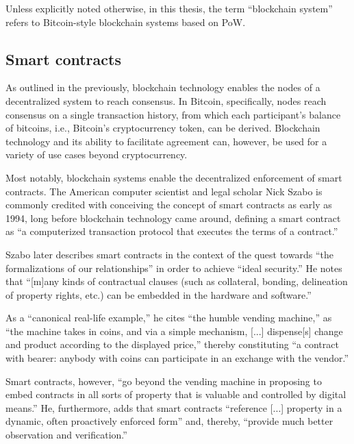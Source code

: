 Unless explicitly noted otherwise, in this thesis, the term ``blockchain system'' refers to Bitcoin-style blockchain systems based on PoW. 

\subsection{Smart contracts}

As outlined in the previously, blockchain technology enables the nodes of a decentralized system to reach consensus.
In Bitcoin, specifically, nodes reach consensus on a single transaction history, from which each participant's balance of bitcoins, i.e., Bitcoin's cryptocurrency token, can be derived.
Blockchain technology and its ability to facilitate agreement can, however, be used for a variety of use cases beyond cryptocurrency.

Most notably, blockchain systems enable the decentralized enforcement of smart contracts.
The American computer scientist and legal scholar Nick Szabo is commonly credited with conceiving the concept of smart contracts as early as 1994, long before blockchain technology came around, defining a smart contract as ``a computerized transaction protocol that executes the terms of a contract.'' \autocite{uva1994smartcontracts}

Szabo later describes smart contracts in the context of the quest towards ``the formalizations of our relationships'' in order to achieve ``ideal security.'' \autocite{uva1997smartcontracts}
He notes that ``[m]any kinds of contractual clauses (such as collateral, bonding, delineation of property rights, etc.) can be embedded in the hardware and software.'' \autocite{uva1997smartcontracts}

As a ``canonical real-life example,'' he cites ``the humble vending machine,'' as ``the machine takes in coins, and via a simple mechanism, [...] dispense[s] change and product according to the displayed price,'' thereby constituting ``a contract with bearer: anybody with coins can participate in an exchange with the vendor.'' \autocite{uva1997smartcontracts}

Smart contracts, however, ``go beyond the vending machine in proposing to embed contracts in all sorts of property that is valuable and controlled by digital means.'' \autocite{uva1997smartcontracts}
He, furthermore, adds that smart contracts ``reference [...] property in a dynamic, often proactively enforced form'' and, thereby, ``provide much better observation and verification.'' \autocite{uva1997smartcontracts}

